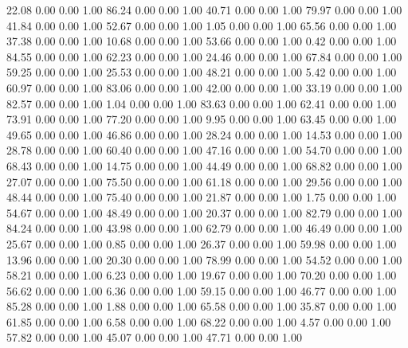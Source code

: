    22.08   0.00   0.00   1.00
   86.24   0.00   0.00   1.00
   40.71   0.00   0.00   1.00
   79.97   0.00   0.00   1.00
   41.84   0.00   0.00   1.00
   52.67   0.00   0.00   1.00
    1.05   0.00   0.00   1.00
   65.56   0.00   0.00   1.00
   37.38   0.00   0.00   1.00
   10.68   0.00   0.00   1.00
   53.66   0.00   0.00   1.00
    0.42   0.00   0.00   1.00
   84.55   0.00   0.00   1.00
   62.23   0.00   0.00   1.00
   24.46   0.00   0.00   1.00
   67.84   0.00   0.00   1.00
   59.25   0.00   0.00   1.00
   25.53   0.00   0.00   1.00
   48.21   0.00   0.00   1.00
    5.42   0.00   0.00   1.00
   60.97   0.00   0.00   1.00
   83.06   0.00   0.00   1.00
   42.00   0.00   0.00   1.00
   33.19   0.00   0.00   1.00
   82.57   0.00   0.00   1.00
    1.04   0.00   0.00   1.00
   83.63   0.00   0.00   1.00
   62.41   0.00   0.00   1.00
   73.91   0.00   0.00   1.00
   77.20   0.00   0.00   1.00
    9.95   0.00   0.00   1.00
   63.45   0.00   0.00   1.00
   49.65   0.00   0.00   1.00
   46.86   0.00   0.00   1.00
   28.24   0.00   0.00   1.00
   14.53   0.00   0.00   1.00
   28.78   0.00   0.00   1.00
   60.40   0.00   0.00   1.00
   47.16   0.00   0.00   1.00
   54.70   0.00   0.00   1.00
   68.43   0.00   0.00   1.00
   14.75   0.00   0.00   1.00
   44.49   0.00   0.00   1.00
   68.82   0.00   0.00   1.00
   27.07   0.00   0.00   1.00
   75.50   0.00   0.00   1.00
   61.18   0.00   0.00   1.00
   29.56   0.00   0.00   1.00
   48.44   0.00   0.00   1.00
   75.40   0.00   0.00   1.00
   21.87   0.00   0.00   1.00
    1.75   0.00   0.00   1.00
   54.67   0.00   0.00   1.00
   48.49   0.00   0.00   1.00
   20.37   0.00   0.00   1.00
   82.79   0.00   0.00   1.00
   84.24   0.00   0.00   1.00
   43.98   0.00   0.00   1.00
   62.79   0.00   0.00   1.00
   46.49   0.00   0.00   1.00
   25.67   0.00   0.00   1.00
    0.85   0.00   0.00   1.00
   26.37   0.00   0.00   1.00
   59.98   0.00   0.00   1.00
   13.96   0.00   0.00   1.00
   20.30   0.00   0.00   1.00
   78.99   0.00   0.00   1.00
   54.52   0.00   0.00   1.00
   58.21   0.00   0.00   1.00
    6.23   0.00   0.00   1.00
   19.67   0.00   0.00   1.00
   70.20   0.00   0.00   1.00
   56.62   0.00   0.00   1.00
    6.36   0.00   0.00   1.00
   59.15   0.00   0.00   1.00
   46.77   0.00   0.00   1.00
   85.28   0.00   0.00   1.00
    1.88   0.00   0.00   1.00
   65.58   0.00   0.00   1.00
   35.87   0.00   0.00   1.00
   61.85   0.00   0.00   1.00
    6.58   0.00   0.00   1.00
   68.22   0.00   0.00   1.00
    4.57   0.00   0.00   1.00
   57.82   0.00   0.00   1.00
   45.07   0.00   0.00   1.00
   47.71   0.00   0.00   1.00
